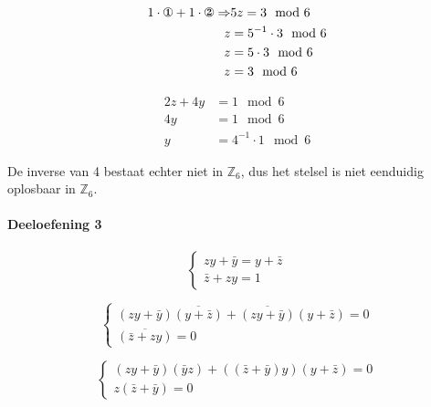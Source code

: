 \documentclass[12pt]{article}
\newcommand{\ov}[1]{\bar{#1}}
\begin{document}

	\begin{align}
		1 \cdot \text{\ding{172}} + 1 \cdot \text{\ding{173}} \Rightarrow & 5z = 3 \mod 6 \\
		z &= 5^{-1} \cdot 3 \mod 6 \\
		z &= 5 \cdot 3 \mod 6 \\
		z &= 3 \mod 6 \\
	\end{align}

	\begin{align}
		2z + 4y &= 1 \mod 6 \\
		4y &= 1 \mod 6 \\
		y &= 4^{-1} \cdot 1 \mod 6
	\end{align}

\par De inverse van 4 bestaat echter niet in $\mathbb{Z}_{6}$, dus het stelsel is niet eenduidig oplosbaar in $\mathbb{Z}_{6}$.

\clearpage

	\paragraph{Deeloefening 3}

	\begin{equation}
        \begin{cases}
            zy + \ov{y} = y + \ov{z} \\
            \ov{z} + zy = 1 
        \end{cases}
    \end{equation}

    \qquad \qquad \qquad \fbox{$f=g$ $\Rightarrow$ $f \ov{g} + \ov{g} f = 0 $}

    \begin{equation}
    	\begin{cases}
    		(zy+\ov{y})\overline{(y+\ov{z})}+\overline{(zy+\ov{y})}(y+\ov{z}) = 0 \\
    		\overline{(\ov{z}+zy)}=0
    	\end{cases}
    \end{equation}

    \begin{equation}
    	\begin{cases}
    		(zy+\ov{y})(\ov{y}z)+((\ov{z}+\ov{y})y)(y+\ov{z}) = 0 \\
    		z(\ov{z}+\ov{y})=0
    	\end{cases}
    \end{equation}
\end{document}
